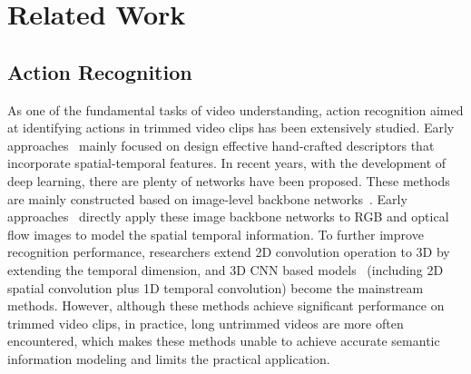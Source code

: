 \documentclass[journal,comsoc]{IEEEtran}
\begin{document}
\section{Related Work}

\subsection{Action Recognition}
\par As one of the fundamental tasks of video understanding, action recognition aimed at identifying actions in trimmed video clips has been extensively studied. Early approaches~\cite{IDT, fisher_recognition} mainly focused on design effective hand-crafted descriptors that incorporate spatial-temporal features. In recent years, with the development of deep learning, there are plenty of networks have been proposed. These methods are mainly constructed based on image-level backbone networks~\cite{AlexNet, GoogleNet, ResNet}. Early approaches~\cite{two_stream, TSN, TRN} directly apply these image backbone networks to RGB and optical flow images to model the spatial temporal information. To further improve recognition performance, researchers extend 2D convolution operation to 3D by extending the temporal dimension, and 3D CNN based models~\cite{C3D, I3D, I2D, R3D, 3DCNN} (including 2D spatial convolution plus 1D temporal convolution) become the mainstream methods. However, although these methods achieve significant performance on trimmed video clips, in practice, long untrimmed videos are more often encountered, which makes these methods unable to achieve accurate semantic information modeling and limits the practical application.
\end{document}
